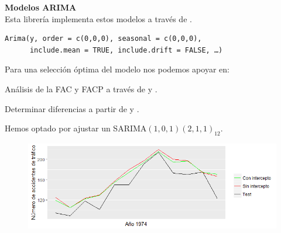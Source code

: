 \documentclass[10pt,a4paper,twoside]{beamer}
\begin{document}
\begin{frame}[fragile]
\textbf{Modelos ARIMA}\\
Esta librería implementa estos modelos a través de .\\
\begin{Verbatim}
Arima(y, order = c(0,0,0), seasonal = c(0,0,0),
      include.mean = TRUE, include.drift = FALSE, …)
\end{Verbatim}

Para una selección óptima del modelo nos podemos apoyar en:
\begin{itemize*}
\item Análisis de la FAC y FACP a través de  y .
\item Determinar diferencias a partir de  y .
\end{itemize*}

Hemos optado por ajustar un SARIMA$(1,0,1)(2,1,1)_{12}$.

\begin{figure}
    \centering
    \centerline{\includegraphics[scale = 0.5]{Images/320.png}}
\end{figure}

\end{frame}

\end{document}
